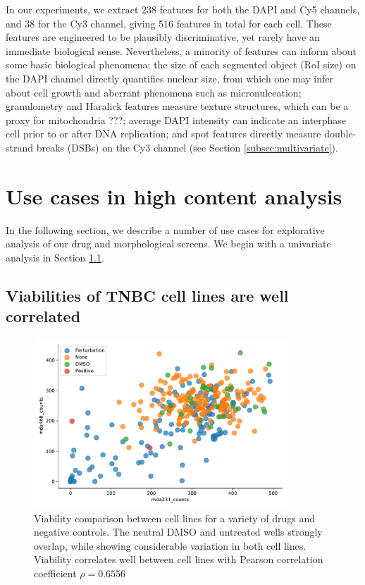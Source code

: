 In our experiments, we extract 238 features for both the DAPI and Cy5 channels, and 38 for the Cy3 channel, giving 516 features in total for each cell. These features are engineered to be plausibly discriminative, yet rarely have an immediate biological sense. Nevertheless, a minority of features can inform about some basic biological phenomena: the size of each segmented object (RoI size) on the DAPI channel directly quantifies nuclear size, from which one may infer about cell growth and aberrant phenomena such as micronulceation; granulometry and Haralick features measure texture structures, which can be a proxy for mitochondria ???; average DAPI intensity can indicate an interphase cell prior to or after DNA replication; and spot features directly measure double-strand breaks (DSBs) on the Cy3 channel (see Section \ref{subsec:multivariate}).

\section{Use cases in high content analysis}

In the following section, we describe a number of use cases for explorative analysis of our drug and morphological screens. We begin with a univariate analysis in Section \ref{subsec:viability}.

\subsection{Viabilities of TNBC cell lines are well correlated}
\label{subsec:viability}

\begin{figure}
\centering
\includegraphics[width=0.85\textwidth]{img/viability.pdf}
\caption{Viability comparison between cell lines for a variety of drugs and negative controls. The neutral DMSO and untreated wells strongly overlap, while showing considerable variation in both cell lines. Viability correlates well between cell lines with Pearson correlation coefficient $\rho = 0.6556$}
\label{fig:viability}
\end{figure}

